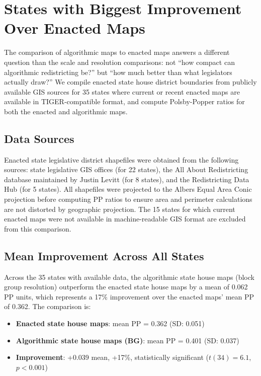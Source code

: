 \section{States with Biggest Improvement Over Enacted Maps}
\label{sec:enacted}

The comparison of algorithmic maps to enacted maps answers a different question than the scale and resolution comparisons: not ``how compact can algorithmic redistricting be?'' but ``how much better than what legislators actually draw?'' We compile enacted state house district boundaries from publicly available GIS sources for 35 states where current or recent enacted maps are available in TIGER-compatible format, and compute Polsby-Popper ratios for both the enacted and algorithmic maps.

\subsection{Data Sources}

Enacted state legislative district shapefiles were obtained from the following sources: state legislative GIS offices (for 22 states), the All About Redistricting database maintained by Justin Levitt (for 8 states), and the Redistricting Data Hub (for 5 states). All shapefiles were projected to the Albers Equal Area Conic projection before computing PP ratios to ensure area and perimeter calculations are not distorted by geographic projection. The 15 states for which current enacted maps were not available in machine-readable GIS format are excluded from this comparison.

\subsection{Mean Improvement Across All States}

Across the 35 states with available data, the algorithmic state house maps (block group resolution) outperform the enacted state house maps by a mean of 0.062 PP units, which represents a 17\% improvement over the enacted maps' mean PP of 0.362. The comparison is:

\begin{itemize}
\item \textbf{Enacted state house maps}: mean PP = 0.362 (SD: 0.051)
\item \textbf{Algorithmic state house maps (BG)}: mean PP = 0.401 (SD: 0.037)
\item \textbf{Improvement}: +0.039 mean, +17\%, statistically significant ($t(34) = 6.1$, $p < 0.001$)
\end{itemize}

